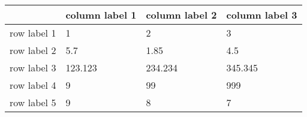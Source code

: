 \begin{tabular}{llll} 
\midrule 
  	 & 	 column label 1 	 & 	 column label 2 	 & 	 column label 3 \\ 
\midrule 
row label 1 	 & 	 1 	 & 	 2 	 & 	 3 \\ 
row label 2 	 & 	 5.7 	 & 	 1.85 	 & 	 4.5 \\ 
row label 3 	 & 	 123.123 	 & 	 234.234 	 & 	 345.345 \\ 
\cmidrule(r){3-4} 	  
row label 4 	 & 	 9 	 & 	 99 	 & 	 999 \\ 
row label 5 	 & 	 9 	 & 	 8 	 & 	 7 \\ 
\midrule 
\end{tabular}
